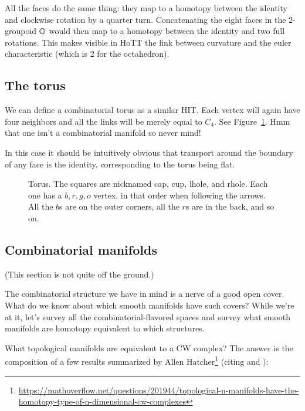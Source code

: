 All the faces do the same thing: they map to a homotopy between the identity and clockwise rotation by a quarter turn. Concatenating the eight faces in the 2-groupoid \( \mathbb{O} \) would then map to a homotopy between the identity and two full rotations. This makes visible in HoTT the link between curvature and the euler characteristic (which is 2 for the octahedron).

\subsection{The torus}

We can define a combinatorial torus as a similar HIT. Each vertex will again have four neighbors and all the links will be merely equal to \( C_4 \). See Figure~\ref{fig:torus}. Hmm that one isn't a combinatorial manifold so never mind!

In this case it should be intuitively obvious that transport around the boundary of any face is the identity, corresponding to the torus being flat.

\begin{figure}[h]
\centering

\caption{Torus. The squares are nicknamed cap, cup, lhole, and rhole. Each one has a \( b, r, g, o \) vertex, in that order when following the arrows. All the \( b \)s are on the outer corners, all the \( r \)s are in the back, and so on.}
\label{fig:torus}
\end{figure}

\subsection{Combinatorial manifolds}

(This section is not quite off the ground.)

The combinatorial structure we have in mind is a nerve of a good open cover. What do we know about which smooth manifolds have such covers? While we're at it, let's survey all the combinatorial-flavored spaces and survey what smooth manifolds are homotopy equivalent to which structures.

What topological manifolds are equivalent to a CW complex? The answer is the composition of a few results summarized by Allen Hatcher\footnote{\url{https://mathoverflow.net/questions/201944/topological-n-manifolds-have-the-homotopy-type-of-n-dimensional-cw-complexes}} (citing \cite{kirby_siebenmann} and \cite{freedman_quinn}):


